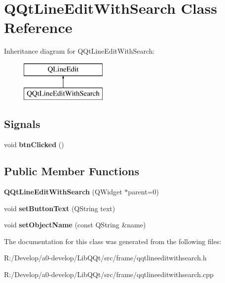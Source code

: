 \hypertarget{class_q_qt_line_edit_with_search}{}\section{Q\+Qt\+Line\+Edit\+With\+Search Class Reference}
\label{class_q_qt_line_edit_with_search}
Inheritance diagram for Q\+Qt\+Line\+Edit\+With\+Search\+:\begin{figure}[H]
\begin{center}
\leavevmode
\includegraphics[height=2.000000cm]{class_q_qt_line_edit_with_search}
\end{center}
\end{figure}
\subsection*{Signals}
\begin{DoxyCompactItemize}
\item 
\mbox{\label{class_q_qt_line_edit_with_search_a5aa1c3840eda1d55615578b484e59c4e}} 
void {\bfseries btn\+Clicked} ()
\end{DoxyCompactItemize}
\subsection*{Public Member Functions}
\begin{DoxyCompactItemize}
\item 
\mbox{\label{class_q_qt_line_edit_with_search_a45266e3aa88b214a8475d032ccd7c73e}} 
{\bfseries Q\+Qt\+Line\+Edit\+With\+Search} (Q\+Widget $\ast$parent=0)
\item 
\mbox{\label{class_q_qt_line_edit_with_search_aed172100e4e35517315045f9476032d1}} 
void {\bfseries set\+Button\+Text} (Q\+String text)
\item 
\mbox{\label{class_q_qt_line_edit_with_search_a6a7cf3905ff4ffed4335d2df15b8b562}} 
void {\bfseries set\+Object\+Name} (const Q\+String \&name)
\end{DoxyCompactItemize}


The documentation for this class was generated from the following files\+:\begin{DoxyCompactItemize}
\item 
R\+:/\+Develop/a0-\/develop/\+Lib\+Q\+Qt/src/frame/qqtlineeditwithsearch.\+h\item 
R\+:/\+Develop/a0-\/develop/\+Lib\+Q\+Qt/src/frame/qqtlineeditwithsearch.\+cpp\end{DoxyCompactItemize}
